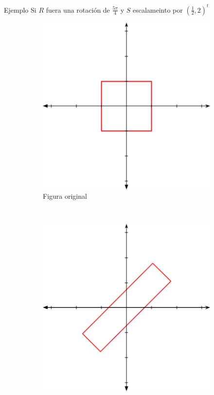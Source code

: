 \begin{frame}{Ejemplo}
Si $R$ fuera una rotación de $\frac{5\pi}{4}$ y $S$ escalameinto por $(\frac{1}{2}, 2)^t$
\begin{figure}[htp]
 \centering
 \begin{subfigure}[b]{0.25\textwidth}
   \includegraphics[width=\textwidth]{img/Square}
   \caption{Figura original}
 \end{subfigure}
 ~
 \begin{subfigure}[b]{0.25\textwidth}
   \includegraphics[width=\textwidth]{img/ScaleRoate}

\end{subfigure}
\end{figure}
\end{frame}

